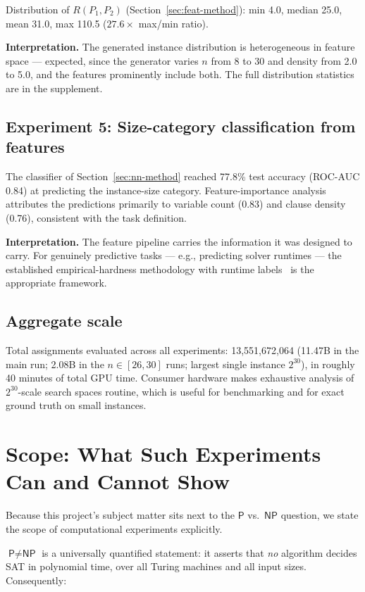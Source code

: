 \documentclass[11pt]{article}
\newcommand{\SAT}{\textsf{SAT}}
\newcommand{\NP}{\textsf{NP}}
\newcommand{\PTIME}{\textsf{P}}
\begin{document}
Distribution of $R(P_1,P_2)$ (Section~\ref{sec:feat-method}): min 4.0, median 25.0, mean 31.0, max 110.5 ($27.6\times$ max/min ratio).

\textbf{Interpretation.} The generated instance distribution is heterogeneous in feature space --- expected, since the generator varies $n$ from 8 to 30 and density from 2.0 to 5.0, and the features prominently include both. The full distribution statistics are in the supplement.

\subsection{Experiment 5: Size-category classification from features}
\label{sec:exp5}

The classifier of Section~\ref{sec:nn-method} reached 77.8\% test accuracy (ROC-AUC 0.84) at predicting the instance-size category. Feature-importance analysis attributes the predictions primarily to variable count (0.83) and clause density (0.76), consistent with the task definition.

\textbf{Interpretation.} The feature pipeline carries the information it was designed to carry. For genuinely predictive tasks --- e.g., predicting solver runtimes --- the established empirical-hardness methodology with runtime labels~\cite{SATzilla} is the appropriate framework.

\subsection{Aggregate scale}
\label{sec:exp6}

Total assignments evaluated across all experiments: 13{,}551{,}672{,}064 (11.47B in the main run; 2.08B in the $n \in [26,30]$ runs; largest single instance $2^{30}$), in roughly 40 minutes of total GPU time. Consumer hardware makes exhaustive analysis of $2^{30}$-scale search spaces routine, which is useful for benchmarking and for exact ground truth on small instances.

\section{Scope: What Such Experiments Can and Cannot Show}
\label{sec:scope}

Because this project's subject matter sits next to the $\PTIME$ vs.\ $\NP$ question, we state the scope of computational experiments explicitly.

$\PTIME \neq \NP$ is a universally quantified statement: it asserts that \emph{no} algorithm decides \SAT{} in polynomial time, over all Turing machines and all input sizes. Consequently:
\end{document}
